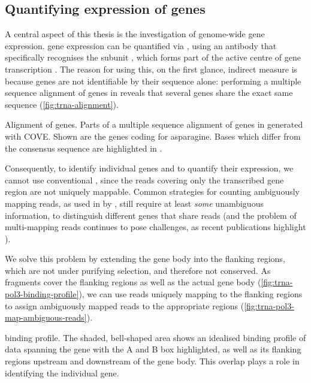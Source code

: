 \subsection{Quantifying expression of  genes}

A central aspect of this thesis is the investigation of genome-wide \trna gene
expression. \trna gene expression can be quantified via  \chipseq, using an
antibody that specifically recognises the  subunit , which
forms part of the active centre of \trna gene transcription
\citep{Ablasser:2009}. The reason for using this, on the first glance, indirect
measure is because \trna genes are not identifiable by their sequence alone:
performing a multiple sequence alignment of \trna genes in \mmu reveals that
several \trna genes share the exact same sequence (\cref{fig:trna-alignment}).

    {\ifoddpage\else\raggedleft\fi%
    \small}
    {Alignment of  genes.}
    {Parts of a multiple sequence alignment of \trna genes in \mmu generated
    with COVE\@. Shown are the \trna genes coding for asparagine. Bases which
    differ from the consensus sequence are highlighted in \primaryname{}.}

Consequently, to identify individual \trna genes and to quantify their
expression, we cannot use conventional \rnaseq, since the \rna reads covering
only the transcribed gene region are not uniquely mappable. Common strategies
for counting ambiguously mapping reads, as used in  by
\citet{Mortazavi:2008}, still require at least \emph{some} unambiguous
information, to distinguish different genes that share reads (and the problem of
multi-mapping reads continues to pose challenges, as recent publications
highlight \citep{Kahles:2015}).

We solve this problem by extending the \trna gene body into the flanking
regions, which are not under purifying selection, and therefore not conserved.
As  \chipseq fragments cover the flanking regions as well as the actual
gene body (\cref{fig:trna-pol3-binding-profile}), we can use reads uniquely
mapping to the flanking regions to assign ambiguously mapped reads to the
appropriate regions (\cref{fig:trna-pol3-map-ambiguous-reads}).

    {   binding profile.}
    {The shaded, bell-shaped area shows an idealised binding profile of \chipseq
    data spanning the \trna gene with the A and B box highlighted, as well as
    its flanking regions upstream and downstream of the gene body. This overlap
    plays a role in identifying the individual gene.}

